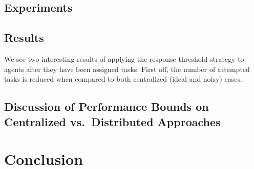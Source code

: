 \documentclass[defaultstyle,12pt]{thesis}
\begin{document}
\section{Experiments}


\section{Results}
We see two interesting results of applying the response threshold strategy to agents after they have been assigned tasks. First off, the number of attempted tasks is reduced when compared to both centralized (ideal and noisy) cases. 



\section{Discussion of Performance Bounds on Centralized vs.~Distributed Approaches}\label{ref:disc}


\chapter{Conclusion}



\end{document}
